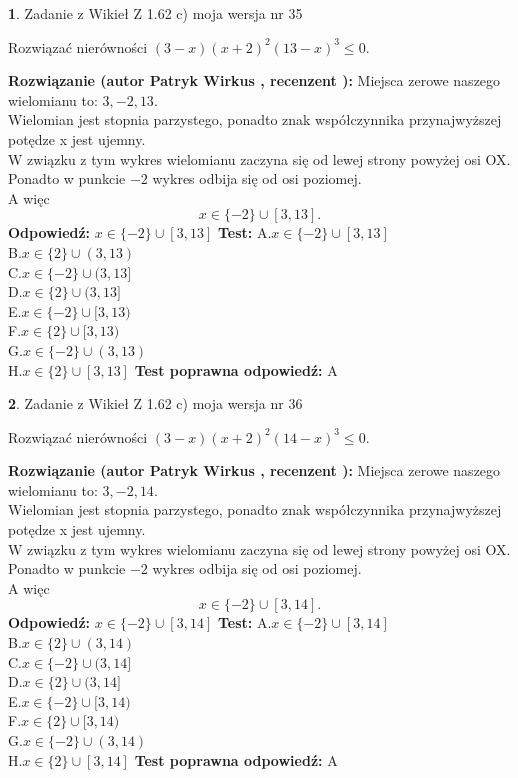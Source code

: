 \documentclass[12pt, a4paper]{article}
\theoremstyle{definition} %
\newtheorem{zad}{}
\newcommand{\zadStart}[1]{\begin{zad}#1\newline}
\newcommand{\zadStop}{\end{zad}}
\newcommand{\rozwStart}[2]{\noindent \textbf{Rozwiązanie (autor #1 , recenzent #2): }\newline}
\newcommand{\rozwStop}{\newline}
\newcommand{\odpStart}{\noindent \textbf{Odpowiedź:}\newline}
\newcommand{\odpStop}{\newline}
\newcommand{\testStart}{\noindent \textbf{Test:}\newline}
\newcommand{\testStop}{\newline}
\newcommand{\kluczStart}{\noindent \textbf{Test poprawna odpowiedź:}\newline}
\newcommand{\kluczStop}{\newline}
\begin{document}
\zadStart{Zadanie z Wikieł Z 1.62 c) moja wersja nr 35}

Rozwiązać nierówności $(3-x)(x+2)^{2}(13-x)^{3}\le0$.
\zadStop
\rozwStart{Patryk Wirkus}{}
Miejsca zerowe naszego wielomianu to: $3, -2, 13$.\\
Wielomian jest stopnia parzystego, ponadto znak współczynnika przy\linebreak najwyższej potędze x jest ujemny.\\ W związku z tym wykres wielomianu zaczyna się od lewej strony powyżej osi OX.\\
Ponadto w punkcie $-2$ wykres odbija się od osi poziomej.\\
A więc $$x \in \{-2\} \cup [3,13].$$
\rozwStop
\odpStart
$x \in \{-2\} \cup [3,13]$
\odpStop
\testStart
A.$x \in \{-2\} \cup [3,13]$\\
B.$x \in \{2\} \cup (3,13)$\\
C.$x \in \{-2\} \cup (3,13]$\\
D.$x \in \{2\} \cup (3,13]$\\
E.$x \in \{-2\} \cup [3,13)$\\
F.$x \in \{2\} \cup [3,13)$\\
G.$x \in \{-2\} \cup (3,13)$\\
H.$x \in \{2\} \cup [3,13]$
\testStop
\kluczStart
A
\kluczStop



\zadStart{Zadanie z Wikieł Z 1.62 c) moja wersja nr 36}

Rozwiązać nierówności $(3-x)(x+2)^{2}(14-x)^{3}\le0$.
\zadStop
\rozwStart{Patryk Wirkus}{}
Miejsca zerowe naszego wielomianu to: $3, -2, 14$.\\
Wielomian jest stopnia parzystego, ponadto znak współczynnika przy\linebreak najwyższej potędze x jest ujemny.\\ W związku z tym wykres wielomianu zaczyna się od lewej strony powyżej osi OX.\\
Ponadto w punkcie $-2$ wykres odbija się od osi poziomej.\\
A więc $$x \in \{-2\} \cup [3,14].$$
\rozwStop
\odpStart
$x \in \{-2\} \cup [3,14]$
\odpStop
\testStart
A.$x \in \{-2\} \cup [3,14]$\\
B.$x \in \{2\} \cup (3,14)$\\
C.$x \in \{-2\} \cup (3,14]$\\
D.$x \in \{2\} \cup (3,14]$\\
E.$x \in \{-2\} \cup [3,14)$\\
F.$x \in \{2\} \cup [3,14)$\\
G.$x \in \{-2\} \cup (3,14)$\\
H.$x \in \{2\} \cup [3,14]$
\testStop
\kluczStart
A
\kluczStop
\end{document}
